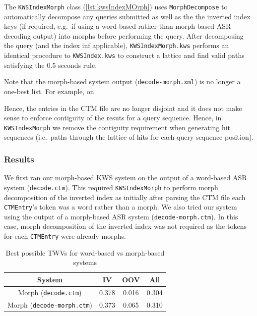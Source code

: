 \documentclass[a4paper,oneside,reqno]{amsart}
\begin{document}
The \texttt{KWSIndexMorph} class (\autoref{lst:kwsIndexMOrph}) uses
\texttt{MorphDecompose} to automatically decompose any queries submitted as
well as the the inverted index keys (if required, e.g.\ if using a word-based
rather than morph-based ASR decoding output) into morphs before performing the
query. After decomposing the query (and the index inf applicable),
\texttt{KWSIndexMorph.kws} performs an identical procedure to
\texttt{KWSIndex.kws} to construct a lattice and find valid paths satisfying the $0.5$
seconds rule.

Note that the morph-based system output (\texttt{decode-morph.xml}) is no longer
a one-best list. For example, on %

Hence, the entries in the CTM file are no longer disjoint and it does not make
sense to enforce contiguity of the resuts for a query sequence. Hence, in
\texttt{KWSIndexMorph} we remove the contiguity requirement when generating hit
sequences (i.e.\ paths through the lattice of hits for each query sequence
position).

\subsubsection{Results}

We first ran our morph-based KWS system on the output of a word-based ASR
system (\texttt{decode.ctm}). This required \texttt{KWSIndexMorph} to perform
morph decomposition of the inverted index as initially after parsing the CTM
file each \texttt{CTMEntry}'s token was a word rather than a morph. We also
tried our system using the output of a morph-based ASR system
(\texttt{decode-morph.ctm}). In this case, morph decomposition of the inverted
index was not required as the tokens for each \texttt{CTMEntry} were already
morphs.

\begin{table}[ht!]
  \begin{tabular}{cccc}
    \toprule
    System                            & IV    & OOV   & All \\
    \midrule
    Morph (\texttt{decode.ctm})       & 0.378 & 0.016 & 0.304 \\
    Morph (\texttt{decode-morph.ctm}) & 0.373 & 0.065 & 0.310 \\
    \bottomrule
  \end{tabular}
  \caption{Best possible TWVs for word-based vs morph-based systems}
  \label{tab:morph}
\end{table}
\end{document}
